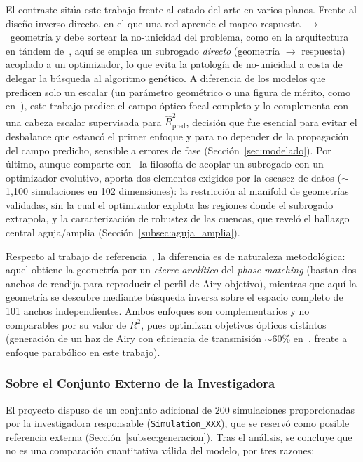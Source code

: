 El contraste sitúa este trabajo frente al estado del arte en varios planos. Frente al diseño inverso directo, en el que una red aprende el mapeo respuesta~$\rightarrow$~geometría y debe sortear la no-unicidad del problema, como en la arquitectura en tándem de~\cite{liu2018tandem}, aquí se emplea un subrogado \textit{directo} (geometría $\rightarrow$ respuesta) acoplado a un optimizador, lo que evita la patología de no-unicidad a costa de delegar la búsqueda al algoritmo genético. A diferencia de los modelos que predicen solo un escalar (un parámetro geométrico o una figura de mérito, como en~\cite{maia2025inverse}), este trabajo predice el campo óptico focal completo y lo complementa con una cabeza escalar supervisada para $\hat{R}^2_{\text{pred}}$, decisión que fue esencial para evitar el desbalance que estancó el primer enfoque y para no depender de la propagación del campo predicho, sensible a errores de fase (Sección~\ref{sec:modelado}). Por último, aunque comparte con~\cite{gao2025surrogate} la filosofía de acoplar un subrogado con un optimizador evolutivo, aporta dos elementos exigidos por la escasez de datos ($\sim$1{,}100 simulaciones en 102 dimensiones): la restricción al manifold de geometrías validadas, sin la cual el optimizador explota las regiones donde el subrogado extrapola, y la caracterización de robustez de las cuencas, que reveló el hallazgo central aguja/amplia (Sección~\ref{subsec:aguja_amplia}).

Respecto al trabajo de referencia~\cite{airy_metalens}, la diferencia es de naturaleza metodológica: aquel obtiene la geometría por un \textit{cierre analítico} del \textit{phase matching} (bastan dos anchos de rendija para reproducir el perfil de Airy objetivo), mientras que aquí la geometría se descubre mediante búsqueda inversa sobre el espacio completo de 101 anchos independientes. Ambos enfoques son complementarios y no comparables por su valor de $R^2$, pues optimizan objetivos ópticos distintos (generación de un haz de Airy con eficiencia de transmisión ${\sim}60\%$ en~\cite{airy_metalens}, frente a enfoque parabólico en este trabajo).

\subsubsection{Sobre el Conjunto Externo de la Investigadora}\label{subsubsec:consultora}

El proyecto dispuso de un conjunto adicional de $200$ simulaciones proporcionadas por la investigadora responsable (\texttt{Simulation\_XXX}), que se reservó como posible referencia externa (Sección~\ref{subsec:generacion}). Tras el análisis, se concluye que no es una comparación cuantitativa válida del modelo, por tres razones:

